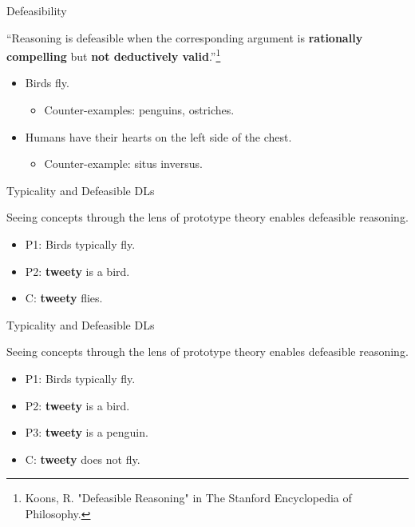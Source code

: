 \documentclass[10pt]{beamer}
\begin{document}
\begin{frame}[fragile]{Defeasibility}

``Reasoning is defeasible when the corresponding argument is \textbf{rationally compelling} but \textbf{not deductively valid}.''\footnote{Koons, R. "Defeasible Reasoning" in The Stanford Encyclopedia of Philosophy.} \pause

\begin{itemize}
  \item Birds fly.\pause
  \begin{itemize}
    \item Counter-examples: penguins, ostriches. \pause
  \end{itemize}
  \item Humans have their hearts on the left side of the chest. \pause
\begin{itemize}
  \item Counter-example: situs inversus.
\end{itemize}
\end{itemize}

\end{frame} 

%

\begin{frame}{Typicality and Defeasible DLs}
\large{Seeing concepts through the lens of prototype theory enables defeasible reasoning. \vspace{2mm}
\begin{itemize}
  \item P1: Birds typically fly.
  \item P2: \textbf{tweety} is a bird.
  \item C: \textbf{tweety} flies.
\end{itemize}
}
\end{frame}

\begin{frame}[fragile]{Typicality and Defeasible DLs}
  \large{Seeing concepts through the lens of prototype theory enables defeasible reasoning. \vspace{2mm}
\begin{itemize}
  \item P1: Birds typically fly.
  \item P2: \textbf{tweety} is a bird.
  \item P3: {\color{red}\textbf{tweety} is a penguin}.
  \item C: \textbf{tweety} {\color{red}does not} fly.
\end{itemize}}
\end{frame}
\end{document}
